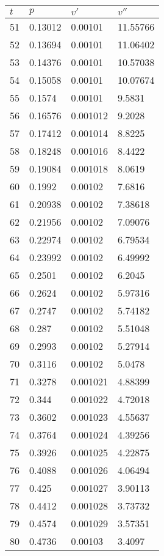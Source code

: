 \documentclass[twocolumn]{article}
\begin{document}
\begin{tabular}{l|l|l|l}
$	t$ &$ p$ &$ v'$ & $v''$ \\ \hline
51	&	0.13012	&	0.00101	&	11.55766 \\ \hline
52	&	0.13694	&	0.00101	&	11.06402 \\ \hline
53	&	0.14376	&	0.00101	&	10.57038 \\ \hline
54	&	0.15058	&	0.00101	&	10.07674 \\ \hline
55	&	0.1574	&	0.00101	&	9.5831 \\ \hline
56	&	0.16576	&	0.001012	&	9.2028 \\ \hline
57	&	0.17412	&	0.001014	&	8.8225 \\ \hline
58	&	0.18248	&	0.001016	&	8.4422 \\ \hline
59	&	0.19084	&	0.001018	&	8.0619 \\ \hline
60	&	0.1992	&	0.00102	&	7.6816 \\ \hline
61	&	0.20938	&	0.00102	&	7.38618 \\ \hline
62	&	0.21956	&	0.00102	&	7.09076 \\ \hline
63	&	0.22974	&	0.00102	&	6.79534 \\ \hline
64	&	0.23992	&	0.00102	&	6.49992 \\ \hline
65	&	0.2501	&	0.00102	&	6.2045 \\ \hline
66	&	0.2624	&	0.00102	&	5.97316 \\ \hline
67	&	0.2747	&	0.00102	&	5.74182 \\ \hline
68	&	0.287	&	0.00102	&	5.51048 \\ \hline
69	&	0.2993	&	0.00102	&	5.27914 \\ \hline
70	&	0.3116	&	0.00102	&	5.0478 \\ \hline
71	&	0.3278	&	0.001021	&	4.88399 \\ \hline
72	&	0.344	&	0.001022	&	4.72018 \\ \hline
73	&	0.3602	&	0.001023	&	4.55637 \\ \hline
74	&	0.3764	&	0.001024	&	4.39256 \\ \hline
75	&	0.3926	&	0.001025	&	4.22875 \\ \hline
76	&	0.4088	&	0.001026	&	4.06494 \\ \hline
77	&	0.425	&	0.001027	&	3.90113 \\ \hline
78	&	0.4412	&	0.001028	&	3.73732 \\ \hline
79	&	0.4574	&	0.001029	&	3.57351 \\ \hline
80	&	0.4736	&	0.00103	&	3.4097 \\ \hline

\end{tabular}
\end{document}
